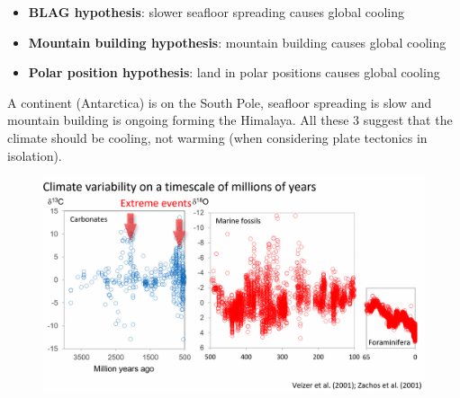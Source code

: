 \begin{itemize}
    \item \textbf{BLAG hypothesis}: slower seafloor spreading causes global
    cooling
    \item \textbf{Mountain building hypothesis}: mountain building causes
    global cooling
    \item \textbf{Polar position hypothesis}: land in polar positions causes
    global cooling
\end{itemize}

A continent (Antarctica) is on the South Pole, seafloor spreading is slow and
mountain building is ongoing forming the Himalaya. All these 3 suggest that the
climate should be cooling, not warming (when considering plate tectonics in
isolation).

\begin{figure}[H]
    \centering
    \includegraphics[width=0.9\linewidth]{content/img/isotope_different_timescales.png}
\end{figure}


